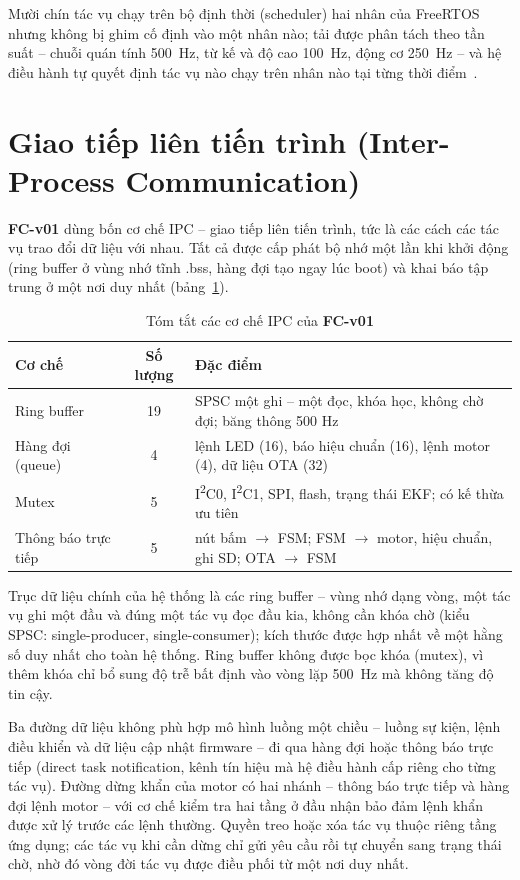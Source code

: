 Mười chín tác vụ chạy trên bộ định thời (scheduler) hai nhân của FreeRTOS nhưng không bị ghim cố định vào một nhân nào; tải được phân tách theo tần suất -- chuỗi quán tính 500~Hz, từ kế và độ cao 100~Hz, động cơ 250~Hz -- và hệ điều hành tự quyết định tác vụ nào chạy trên nhân nào tại từng thời điểm~\cite{cervin2003,zhang2021}.

\section{Giao tiếp liên tiến trình (Inter-Process Communication)}

\textbf{FC-v01} dùng bốn cơ chế IPC -- giao tiếp liên tiến trình, tức là các cách các tác vụ trao đổi dữ liệu với nhau. Tất cả được cấp phát bộ nhớ một lần khi khởi động (ring buffer ở vùng nhớ tĩnh .bss, hàng đợi tạo ngay lúc boot) và khai báo tập trung ở một nơi duy nhất (bảng~\ref{tab:ipc}).

\begin{table}[h]
\centering
\caption{Tóm tắt các cơ chế IPC của \textbf{FC-v01}}
\label{tab:ipc}
\small
\setlength{\tabcolsep}{4pt}
\begin{tabular}{p{3.4cm}cp{8.6cm}}
\toprule
Cơ chế & Số lượng & Đặc điểm \\
\midrule
Ring buffer & 19 & SPSC một ghi -- một đọc, khóa học, không chờ đợi; băng thông 500 Hz \\
Hàng đợi (queue) & 4 & lệnh LED (16), báo hiệu chuẩn (16), lệnh motor (4), dữ liệu OTA (32) \\
Mutex & 5 & I\textsuperscript{2}C0, I\textsuperscript{2}C1, SPI, flash, trạng thái EKF; có kế thừa ưu tiên \\
Thông báo trực tiếp & 5 & nút bấm $\rightarrow$ FSM; FSM $\rightarrow$ motor, hiệu chuẩn, ghi SD; OTA $\rightarrow$ FSM \\
\bottomrule
\end{tabular}
\end{table}

Trục dữ liệu chính của hệ thống là các ring buffer -- vùng nhớ dạng vòng, một tác vụ ghi một đầu và đúng một tác vụ đọc đầu kia, không cần khóa chờ (kiểu SPSC: single-producer, single-consumer); kích thước được hợp nhất về một hằng số duy nhất cho toàn hệ thống. Ring buffer không được bọc khóa (mutex), vì thêm khóa chỉ bổ sung độ trễ bất định vào vòng lặp 500~Hz mà không tăng độ tin cậy.

Ba đường dữ liệu không phù hợp mô hình luồng một chiều -- luồng sự kiện, lệnh điều khiển và dữ liệu cập nhật firmware -- đi qua hàng đợi hoặc thông báo trực tiếp (direct task notification, kênh tín hiệu mà hệ điều hành cấp riêng cho từng tác vụ). Đường dừng khẩn của motor có hai nhánh -- thông báo trực tiếp và hàng đợi lệnh motor -- với cơ chế kiểm tra hai tầng ở đầu nhận bảo đảm lệnh khẩn được xử lý trước các lệnh thường. Quyền treo hoặc xóa tác vụ thuộc riêng tầng ứng dụng; các tác vụ khi cần dừng chỉ gửi yêu cầu rồi tự chuyển sang trạng thái chờ, nhờ đó vòng đời tác vụ được điều phối từ một nơi duy nhất.

